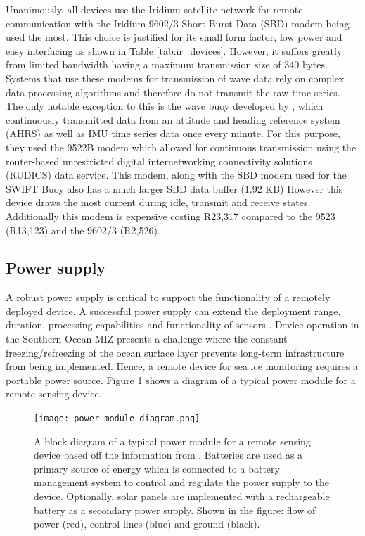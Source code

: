 Unanimously, all devices use the Iridium satellite network for remote communication with the Iridium 9602/3 Short Burst Data (SBD) modem being used the most. This choice is justified for its small form factor, low power and easy interfacing as shown in Table \ref{tab:ir_devices}. However, it suffers greatly from limited bandwidth having a maximum transmission size of 340 bytes. Systems that use these modems for transmission of wave data rely on complex data processing algorithms and therefore do not transmit the raw time series. The only notable exception to this is the wave buoy developed by \textcite{doble2017robust}, which continuously transmitted  data from an attitude and heading reference system (AHRS) as well as IMU time series data once every minute. For this purpose, they used the 9522B modem which allowed for continuous transmission using the router-based unrestricted digital internetworking connectivity solutions (RUDICS) data service. This modem, along with the SBD modem used for the SWIFT Buoy also has a much larger SBD data buffer (1.92 KB) However this device draws the most current during idle, transmit and receive states. Additionally this modem is expensive costing R23,317 compared to the 9523 (R13,123) and the 9602/3 (R2,526).  

\subsection{Power supply}

A robust power supply is critical to support the functionality of a remotely deployed device. A successful power supply can extend the deployment range, duration, processing capabilities and functionality of sensors \cite{kennicutt2016delivering}. Device operation in the Southern Ocean MIZ presents a challenge where the constant freezing/refreezing of the ocean surface layer prevents long-term infrastructure from being implemented. Hence, a remote device for sea ice monitoring requires a portable power source. Figure \ref{fig:powermoddiag} shows a diagram of a typical power module for a remote sensing device.

\begin{figure}[H]
	\centering
	\texttt{[image: power module diagram.png]}
	\caption{A block diagram of a typical power module for a remote sensing device based off the information from \cite{rabault2019open,doble2017robust,vidal2019xev}. Batteries are used as a primary source of energy which is connected to a battery management system to control and regulate the power supply to the device. Optionally, solar panels are implemented with a rechargeable battery as a secondary power supply. Shown in the figure: flow of power (red), control lines (blue) and ground (black).}
	\label{fig:powermoddiag}
\end{figure}

